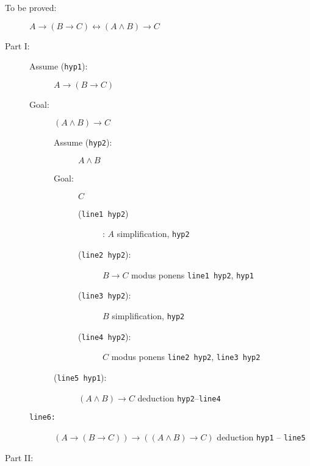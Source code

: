 \documentclass[12pt]{article}
\begin{document}
\begin{description}

\item[To be proved:]  $A \rightarrow (B \rightarrow C) \leftrightarrow (A \wedge B) \rightarrow C$

\item[Part I:]

\begin{description}

\item[Assume ({\tt hyp1}):]  $A \rightarrow (B \rightarrow C)$

\item[Goal:]  $(A \wedge B) \rightarrow C$

\begin{description}

\item[Assume ({\tt hyp2}):]  $A \wedge B$

\item[Goal:] $C$

\begin{description}

\item[({\tt line1 hyp2})]:  $A$  simplification, {\tt hyp2}

\item[({\tt line2 hyp2}):]  $B \rightarrow C$ modus ponens {\tt line1 hyp2}, {\tt hyp1}

\item[({\tt line3 hyp2}):]  $B$ simplification, {\tt hyp2}

\item [({\tt line4 hyp2}):]  $C$  modus ponens {\tt line2 hyp2}, {\tt line3 hyp2}

\end{description}

\item[({\tt line5 hyp1}):]  $(A \wedge B) \rightarrow C$  deduction {\tt hyp2}--{\tt line4}

\end{description}

\item[{\tt line6:}]  $(A \rightarrow (B \rightarrow C) )\rightarrow ((A \wedge B) \rightarrow C)$ deduction {\tt hyp1} -- {\tt line5}

\end{description}

\item[Part II:]

\begin{description}


\end{description}
\end{description}
\end{document}
